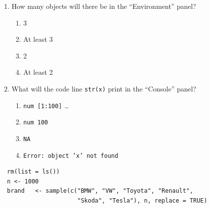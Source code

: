 \documentclass{article}
\begin{document}
\begin{enumerate}[resume]
  \item How many objects will there be in the ``Environment'' panel?
  \begin{enumerate}[label=\Alph*)]
    \item 3
    \item At least 3
    \item 2
    \item At least 2
  \end{enumerate}
  \item What will the code line \texttt{str(x)} print in the ``Console'' panel?
  \begin{enumerate}[label=\Alph*)]
    \item \texttt{num [1:100]} \dots
    \item \texttt{num 100}
    \item \texttt{NA}
    \item \texttt{Error: object 'x' not found}
  \end{enumerate}
\end{enumerate}

\newpage

\begin{lstlisting}
  rm(list = ls())
  n <- 1000 
  brand   <- sample(c("BMW", "VW", "Toyota", "Renault", 
                      "Skoda", "Tesla"), n, replace = TRUE)
\end{lstlisting}
\end{document}
